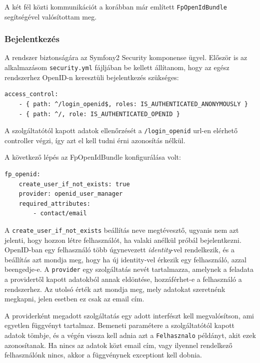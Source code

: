 \documentclass[a4paper,12pt,oneside]{report}
\begin{document}
A két fél közti kommunikációt a korábban már említett {\tt FpOpenIdBundle} segítségével valósítottam meg.

\subsubsection*{Bejelentkezés}

A rendszer biztonságára az Symfony2 Security komponense ügyel. Először is az alkalmazásom {\tt security.yml} fájljában be kellett állítanom, hogy az egész rendszerhez OpenID-n keresztüli bejelentkezés szükséges:

\begin{lstlisting}
access_control:
    - { path: ^/login_openid$, roles: IS_AUTHENTICATED_ANONYMOUSLY }
    - { path: ^/, role: IS_AUTHENTICATED_OPENID }
\end{lstlisting}

A szolgáltatótól kapott adatok ellenőrzését a {\tt /login\_openid} url-en elérhető controller végzi, így azt el kell tudni érni azonosítás nélkül.

A következő lépés az FpOpenIdBundle konfigurálása volt:

\begin{lstlisting}
fp_openid:
    create_user_if_not_exists: true
    provider: openid_user_manager
    required_attributes:
        - contact/email
\end{lstlisting}

A {\tt create\_user\_if\_not\_exists} beállítás neve megtévesztő, ugyanis nem azt jelenti, hogy hozzon létre felhasználót, ha valaki anélkül próbál bejelentkezni. OpenID-ban egy felhasználó több úgynevezett {\em identity}-vel rendelkezik, és a beállítás azt mondja meg, hogy ha új identity-vel érkezik egy felhasználó, azzal beengedje-e. A {\tt provider} egy szolgáltatás nevét tartalmazza, amelynek a feladata a providertől kapott adatokból annak eldöntése, hozzáférhet-e a felhasználó a rendszerhez. Az utolsó érték azt mondja meg, mely adatokat szeretnénk megkapni, jelen esetben ez csak az email cím.

A providerként megadott szolgáltatás egy adott interfészt kell megvalósítson, ami egyetlen függvényt tartalmaz. Bemeneti paramétere a szolgáltatótól kapott adatok tömbje, és a végén vissza kell adnia azt a {\tt Felhasznalo} példányt, akit ezek azonosítanak. Ha nincs az adatok közt email cím, vagy ilyennel rendelkező felhasználónk nincs, akkor a függvénynek exceptiont kell dobnia.

\end{document}
